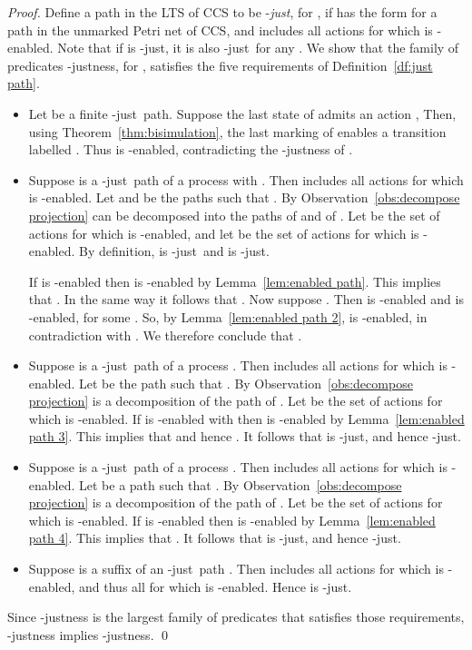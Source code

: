 \documentclass[smallcondensed]{svjour3}
\newcommand{\Thm}[1]{Theorem~\ref{thm:#1}}
\newcommand{\Lem}[1]{Lemma~\ref{lem:#1}}
\newcommand{\Def}[1]{Definition~\ref{df:#1}}
\begin{document}
\newcommand{\ejustn}{just}
\newcommand{\ejust}{just\ }
\newcommand{\Obs}[1]{Observation~\ref{obs:#1}}
\begin{proof}
  Define a path  in the LTS of CCS to be -\emph{\ejustn}, for ,
  if  has the form  for  a path in the unmarked Petri net of CCS, and
   includes all actions  for which  is -enabled.
  Note that if  is -\ejustn, it is also -\ejust for any .
  We show that the family of predicates -justness, for ,
  satisfies the five requirements of \Def{just path}.
  
  \begin{itemize}
  \item Let  be a finite -\ejust path. Suppose the last state  of  admits an action ,
  Then, using \Thm{bisimulation}, the last marking  of  enables a
  transition labelled . Thus  is -enabled, contradicting the -justness of .

  \item Suppose  is a -\ejust path of a process  {with }.
  Then  includes all actions  for which  is -enabled.
  Let  and  be the paths such that .
  By \Obs{decompose projection}  can be decomposed into the paths  of  and  of .
  Let  be the set of actions  for which  is -enabled,
  and let  be the set of actions  for which  is -enabled.
  By definition,  is -\ejust and  is -\ejustn. 
  
  If  is -enabled then  is -enabled by \Lem{enabled path}.
  This implies that .
  In the same way it follows that .
  Now suppose .
  Then  is -enabled and  is -enabled, for some .
  So, by \Lem{enabled path 2},  is -enabled, in contradiction with .
  We therefore conclude that .

  \item Suppose  is a -\ejust path of a process .
  Then  includes all actions  for which  is -enabled.
  Let  be the path such that .
  By \Obs{decompose projection}  is a decomposition of the path  of .
  Let  be the set of actions  for which  is -enabled.
  If  is -enabled with  then  is -enabled by \Lem{enabled path 3}.
  This implies that  and hence .
  It follows that  is -\ejustn, and hence -\ejustn.

  \item Suppose  is a -\ejust path of a process .
  Then  includes all actions  for which  is -enabled.
  Let  be a path such that .
  By \Obs{decompose projection}  is a decomposition of the path  of .
  Let  be the set of actions  for which  is -enabled.
  If  is -enabled then  is -enabled by \Lem{enabled path 4}.
  This implies that .
  It follows that  is -\ejustn, and hence -\ejustn.

  \item Suppose  is a suffix of an -\ejust path .
  Then  includes all actions  for which  is -enabled, and
  thus all  for which  is -enabled. Hence  is -\ejustn.
  \end{itemize}
  Since -justness is the largest family of
  predicates that satisfies those requirements, -justness implies -justness.
\qed\end{proof}
\end{document}
